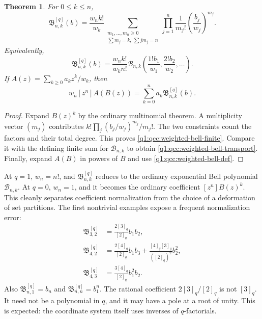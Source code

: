 \documentclass[11pt,a4paper,oneside,openany]{book}
\newtheorem{theorem}{Theorem}[chapter]
\theoremstyle{definition}
\theoremstyle{remark}
\newcommand{\qi}[2][q]{[#2]_{#1}}
\newcommand{\B}[2]{\mathcal B_{#1,#2}}
\newcommand{\qB}[2]{\mathfrak B^{[q]}_{#1,#2}}
\begin{document}
\begin{theorem}\label{q1:qcc:weighted-bell}
For \(0\le k\le n\),
\begin{equation}\label{q1:qcc:weighted-bell-finite}
 \qB nk(b)=\frac{w_nk!}{w_k}
 \sum_{\substack{m_1,\ldots,m_n\ge0\\\sum m_j=k,\ \sum j m_j=n}}
 \prod_{j=1}^n\frac1{m_j!}\left(\frac{b_j}{w_j}\right)^{m_j}.
\end{equation}
Equivalently,
\begin{equation}\label{q1:qcc:weighted-bell-transport}
 \qB nk(b)=\frac{w_nk!}{w_kn!}\B nk
       \left(\frac{1!b_1}{w_1},\frac{2!b_2}{w_2},\ldots\right).
\end{equation}
If \(A(z)=\sum_{k\ge0}a_kz^k/w_k\), then
\begin{equation}\label{q1:qcc:composition-formula}
 w_n[z^n]A(B(z))=\sum_{k=0}^n a_k\qB nk(b).
\end{equation}
\end{theorem}
\begin{proof}
Expand \(B(z)^k\) by the ordinary multinomial theorem. A multiplicity vector
\((m_j)\) contributes \(k!\prod_j(b_j/w_j)^{m_j}/m_j!\).
The two constraints count the factors and their total degree. This proves
\eqref{q1:qcc:weighted-bell-finite}. Compare it with the defining finite sum for
\(\B nk\) to obtain \eqref{q1:qcc:weighted-bell-transport}. Finally, expand
\(A(B)\) in powers of \(B\) and use \eqref{q1:qcc:weighted-bell-def}.
\end{proof}
At \(q=1\), \(w_n=n!\), and \(\mathfrak B^{[q]}_{n,k}\) reduces to the
ordinary exponential Bell polynomial \(\B nk\). At \(q=0\), \(w_n=1\),
and it becomes the ordinary coefficient \([z^n]B(z)^k\). This cleanly separates
coefficient normalization from the choice of a deformation of set partitions.
The first nontrivial examples expose a frequent normalization error:
\begin{align}
 \qB32&=\frac{2\qi3}{\qi2}b_1b_2,\label{q2:eq:Bq32}\\
 \qB42&=\frac{2\qi4}{\qi2}b_1b_3
             +\frac{\qi4\qi3}{(\qi2)^2}b_2^2,\label{q2:eq:Bq42}\\
 \qB43&=\frac{3\qi4}{\qi2}b_1^2b_2.
 \label{q2:eq:Bq43}
\end{align}
Also $\qB n1=b_n$ and $\qB nn=b_1^n$. The rational coefficient
$2\qi3/\qi2$ is not $\qi3$. It need not be a polynomial in $q$, and it may have a
pole at a root of unity. This is expected: the coordinate system itself uses
inverses of $q$-factorials.
\end{document}
